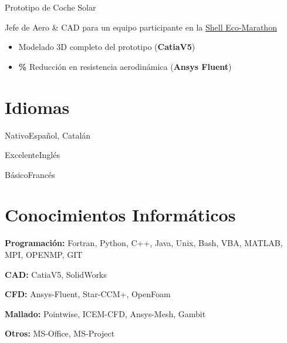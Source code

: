 \documentclass[fontsize=10pt]{tccv_esp}
\begin{document}
\begin{eventlist}
     {Prototipo de Coche Solar}

Jefe de Aero \& CAD para un equipo participante en la
\href{http://www.shell.com/global/environment-society/ecomarathon.html}{Shell
Eco-Marathon}
\begin{itemize}
\itemsep -2pt
	\item Modelado 3D completo del prototipo (\textbf{CatiaV5})
	\item \textbf{\%} Reducci\'on en resistencia aerodin\'amica (\textbf{Ansys Fluent})
\end{itemize}
\end{eventlist}

\vspace{-20pt}
\section{Idiomas}
\begin{factlist}
\item{Nativo}{Espa\~{n}ol, Catal\'an}
\item{Excelente}{Ingl\'es}
\item{B\'asico}{Franc\'es}
\end{factlist}

\vspace{-20pt}
\section{Conocimientos Inform\'aticos}
\begin{factlist}
\item{\textbf{Programaci\'on:}}
     {Fortran, Python, C++, Java, Unix, Bash, VBA, MATLAB, MPI, OPENMP, GIT}
\item{\textbf{CAD:}}
     {CatiaV5, SolidWorks}
\item{\textbf{CFD:}}
     {Ansys-Fluent, Star-CCM+, OpenFoam}
\item{\textbf{Mallado:}}
     {Pointwise, ICEM-CFD, Ansys-Mesh, Gambit}
\item{\textbf{Otros:}}
     {MS-Office, MS-Project}
\end{factlist}


\vspace{-20pt}
\end{document}
